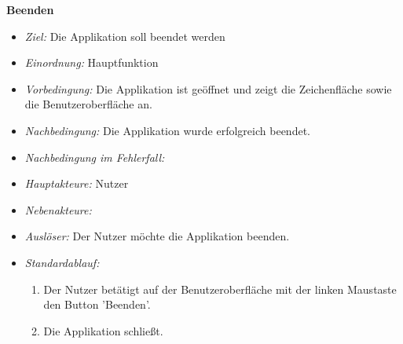 \textbf{Beenden}
  \begin{itemize}
  \item \textit{Ziel:} Die Applikation soll beendet werden
  \item \textit{Einordnung:} Hauptfunktion
  \item \textit{Vorbedingung:} Die Applikation ist ge\"offnet und zeigt die Zeichenfl\"ache sowie die Benutzeroberfl\"ache an.
  \item \textit{Nachbedingung:} Die Applikation wurde erfolgreich beendet.
  \item \textit{Nachbedingung im Fehlerfall:} 
  \item \textit{Hauptakteure:} Nutzer
  \item \textit{Nebenakteure:}
  \item \textit{Ausl\"oser:} Der Nutzer m\"ochte die Applikation beenden.
    \item \textit{Standardablauf:}
    \begin{enumerate}[label=(\arabic*)]
    \item Der Nutzer bet\"atigt auf der Benutzeroberfl\"ache mit der linken Maustaste den Button 'Beenden'.
    \item Die Applikation schlie\ss t.
    \end{enumerate}
 \end{itemize}